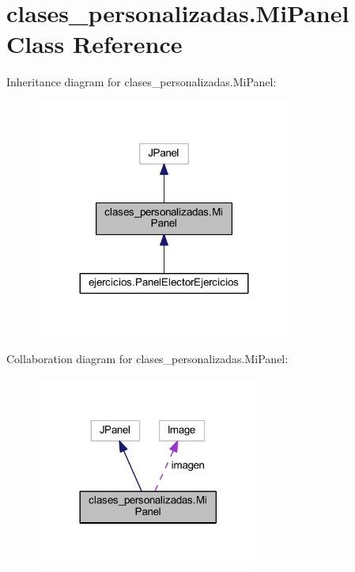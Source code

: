 \hypertarget{classclases__personalizadas_1_1_mi_panel}{}\section{clases\+\_\+personalizadas.\+Mi\+Panel Class Reference}
\label{classclases__personalizadas_1_1_mi_panel}


Inheritance diagram for clases\+\_\+personalizadas.\+Mi\+Panel\+:
\nopagebreak
\begin{figure}[H]
\begin{center}
\leavevmode
\includegraphics[width=239pt]{classclases__personalizadas_1_1_mi_panel__inherit__graph}
\end{center}
\end{figure}


Collaboration diagram for clases\+\_\+personalizadas.\+Mi\+Panel\+:
\nopagebreak
\begin{figure}[H]
\begin{center}
\leavevmode
\includegraphics[width=209pt]{classclases__personalizadas_1_1_mi_panel__coll__graph}
\end{center}
\end{figure}
